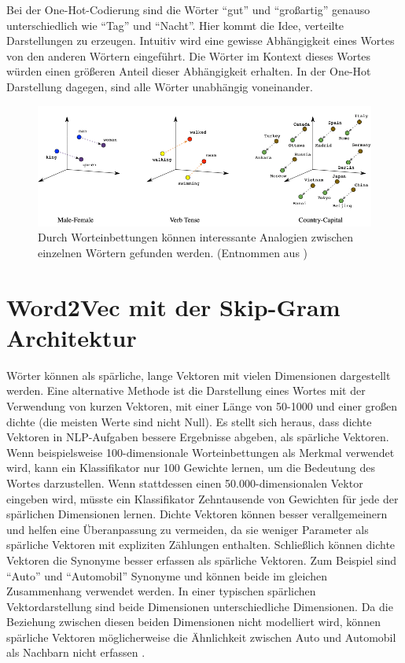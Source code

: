Bei der One-Hot-Codierung sind die Wörter \enquote{gut} und \enquote{großartig} genauso unterschiedlich wie \enquote{Tag} und \enquote{Nacht}. Hier kommt die Idee, verteilte Darstellungen zu erzeugen. Intuitiv wird eine gewisse Abhängigkeit eines Wortes von den anderen Wörtern eingeführt. Die Wörter im Kontext dieses Wortes würden einen größeren Anteil dieser Abhängigkeit erhalten. In der One-Hot Darstellung dagegen, sind alle Wörter unabhängig voneinander.

\begin{figure}[H]
    \centering
    \includegraphics[width=14cm]{kapitel3/wordem.png}
    \caption[Worteinbettungen erzeugen Analogien zwischen Wörtern]{Durch Worteinbettungen können interessante Analogien zwischen einzelnen Wörtern gefunden werden. (Entnommen aus \cite*{wordemdgood})}
    \label{Word2Vec1}
\end{figure}



\section{Word2Vec mit der Skip-Gram Architektur}

Wörter können als spärliche, lange Vektoren mit vielen Dimensionen dargestellt werden. Eine alternative Methode ist die Darstellung eines Wortes mit der Verwendung von kurzen Vektoren, mit einer Länge von 50-1000 und einer großen dichte (die meisten Werte sind nicht Null). Es stellt sich heraus, dass dichte Vektoren in NLP-Aufgaben bessere Ergebnisse abgeben, als spärliche Vektoren. Wenn beispielsweise 100-dimensionale Worteinbettungen als Merkmal verwendet wird, kann ein Klassifikator nur 100 Gewichte lernen, um die Bedeutung des Wortes darzustellen. Wenn  stattdessen einen 50.000-dimensionalen Vektor eingeben wird, müsste ein Klassifikator Zehntausende von Gewichten für jede der spärlichen Dimensionen lernen. Dichte Vektoren können besser verallgemeinern und helfen eine Überanpassung zu vermeiden, da sie weniger Parameter als spärliche Vektoren mit expliziten Zählungen enthalten. Schließlich können dichte Vektoren die Synonyme besser erfassen als spärliche Vektoren. Zum Beispiel sind \enquote{Auto} und \enquote{Automobil} Synonyme und können beide im gleichen Zusammenhang verwendet werden. In einer typischen spärlichen Vektordarstellung sind beide Dimensionen unterschiedliche Dimensionen. Da die Beziehung zwischen diesen beiden Dimensionen nicht modelliert wird, können spärliche Vektoren möglicherweise die Ähnlichkeit zwischen Auto und Automobil als Nachbarn nicht erfassen \cite*[110-111]{Jurafskya}.


